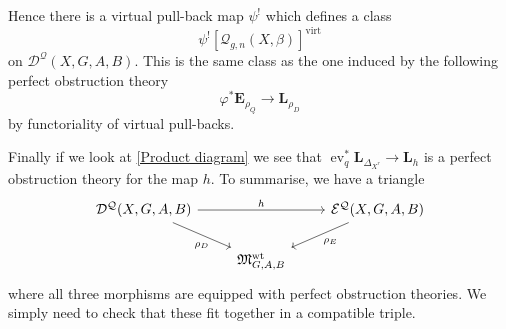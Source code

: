 \documentclass[11pt]{amsart}
\newcommand{\Q}[4]{\mathcal{Q}_{#1,#2}(#3,#4)}
\newcommand{\D}[3]{\mathcal{D^Q}(#1,#2,#3)}
\newcommand{\E}[3]{\mathcal{E^Q}(#1,#2,#3)}
\renewcommand{\to}{\rightarrow}
\newcommand{\EE}{\mathbf{E}}
\newcommand{\LL}{\mathbf{L}}
\newcommand{\MM}{\mathfrak M}
\newcommand{\virt}[1]{[#1]^{\operatorname{virt}}}
\newcommand{\ev}{\operatorname{ev}}
\theoremstyle{definition}
\theoremstyle{definition}
\begin{document}
Hence there is a virtual pull-back map $\psi^!$ which defines a class
\begin{equation*}\psi^! \virt{\Q{g}{n}{X}{\beta}} \end{equation*}
on $\mathcal{D}^{\mathcal{Q}}(X,G,A,B)$. This is the same class as the one induced by the following perfect obstruction theory
\begin{equation*} \varphi^* \EE_{\rho_Q} \to \LL_{\rho_D} \end{equation*}
by functoriality of virtual pull-backs.

Finally if we look at \eqref{Product diagram} we see that $\ev_q^* \LL_{\Delta_{X^r}} \to \LL_h$ is a perfect obstruction theory for the map $h$. To summarise, we have a triangle
\begin{equation}\label{D-E-triangle}
 \begin{tikzcd}
  \D{X}{G,A}{B} \ar[dr,"\rho_D" below=0.1cm] \ar[rr,"h"] & & \E{X}{G,A}{B}\ar[dl,"\rho_E"] \\
& \MM_{G,A,B}^{\operatorname{wt}} &
 \end{tikzcd}
\end{equation}
where all three morphisms are equipped with perfect obstruction theories. We simply need to check that these fit together in a compatible triple.
\end{document}
